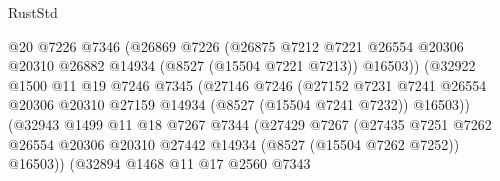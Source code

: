 \begin{lexlean}{RustStd}
\begin{coremodule}
                                  @20
                                  @7226
                                  @7346
                                  (@26869
                                    @7226
                                    (@26875
                                      @7212
                                      @7221
                                      @26554
                                      @20306
                                      @20310
                                      @26882
                                      @14934
                                      (@8527 (@15504 @7221 @7213))
                                      @16503))
                                  (@32922
                                    @1500
                                    @11
                                    @19
                                    @7246
                                    @7345
                                    (@27146
                                      @7246
                                      (@27152
                                        @7231
                                        @7241
                                        @26554
                                        @20306
                                        @20310
                                        @27159
                                        @14934
                                        (@8527 (@15504 @7241 @7232))
                                        @16503))
                                    (@32943
                                      @1499
                                      @11
                                      @18
                                      @7267
                                      @7344
                                      (@27429
                                        @7267
                                        (@27435
                                          @7251
                                          @7262
                                          @26554
                                          @20306
                                          @20310
                                          @27442
                                          @14934
                                          (@8527 (@15504 @7262 @7252))
                                          @16503))
                                      (@32894
                                        @1468
                                        @11
                                        @17
                                        @2560
                                        @7343

\end{coremodule}
\end{lexlean}
